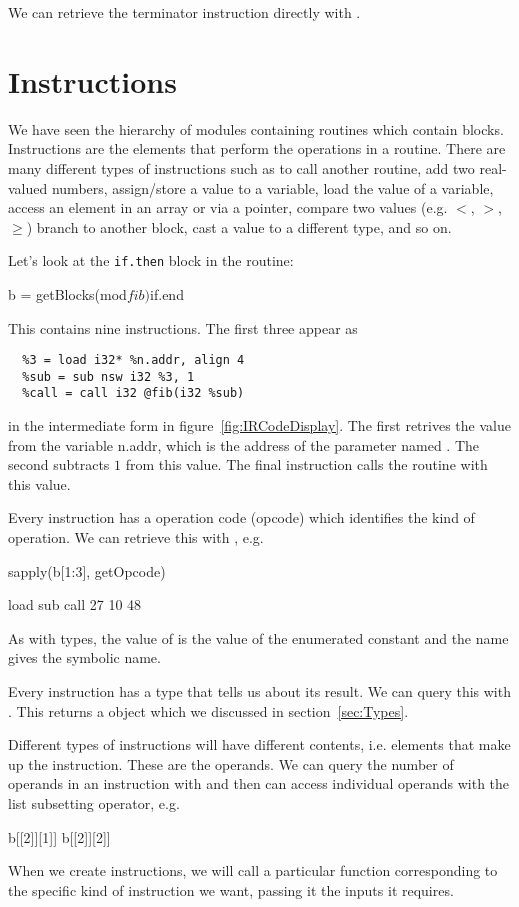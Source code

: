 \documentclass[article]{jss}
\begin{document}
We can retrieve the terminator instruction directly with
.

\section{Instructions}
We have seen the hierarchy of modules containing routines which
contain blocks.  Instructions are the elements that perform the
operations in a routine.  There are many different types of
instructions such as to call another routine,
add two real-valued numbers, assign/store
a value to a variable, load the value of a variable,
access an element in an array or via a pointer,
compare two values (e.g. $<$, $>$, $\ge$)
branch to another block, cast a value to a different type, and so on.

Let's look at the \texttt{if.then} block in the
 routine:
\begin{RCode}
b = getBlocks(mod$fib)$if.end
\end{RCode}
This contains nine instructions.
The first three appear as 
\begin{Verbatim}
  %3 = load i32* %n.addr, align 4
  %sub = sub nsw i32 %3, 1
  %call = call i32 @fib(i32 %sub)  
\end{Verbatim}
in the intermediate form in figure~\ref{fig:IRCodeDisplay}.
The first retrives the value from the variable n.addr, which 
is the address of the parameter named .
The second subtracts $1$ from this value.
The final instruction calls the  routine with this value.

Every instruction has a operation code (opcode) which identifies
the kind of operation. We can retrieve this with ,
e.g.
\begin{RCode}
sapply(b[1:3], getOpcode)
\end{RCode}
\begin{ROutput}
load  sub call 
  27   10   48   
\end{ROutput}
As with types, the value of  is the value of the
\C{} enumerated constant and the name gives the symbolic name.


Every instruction has a type that tells us about its result. 
We can query this with . This returns a
 object which we discussed in section~\ref{sec:Types}.

Different types of instructions will have different contents,
i.e. elements that make up the instruction.
These are the operands.
We can query the number of operands in an instruction with 
and then can access individual operands with the  list subsetting
operator, e.g.
\begin{RCode}
b[[2]][1]]
b[[2]][2]]
\end{RCode}
When we create instructions, we will call a particular
function corresponding to the specific kind of instruction
we want, passing it the inputs it requires.
\end{document}
